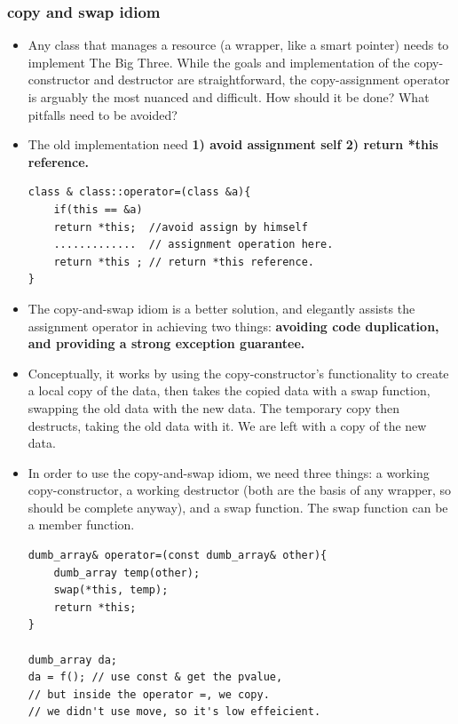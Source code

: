\documentclass[a4paper,11pt,twoside]{book}
\begin{document}
\subsubsection{copy and swap idiom}
\begin{itemize}
	\item Any class that manages a resource (a wrapper, like a smart pointer) needs to implement The Big Three. While the goals and implementation of the copy-constructor and destructor are straightforward, the copy-assignment operator is arguably the most nuanced and difficult. How should it be done? What pitfalls need to be avoided?
	
	\item The old implementation need  \textbf{1) avoid assignment self 2) return *this reference. }
\begin{lstlisting}[numbers=none]
class & class::operator=(class &a){
	if(this == &a)
	return *this;  //avoid assign by himself
	.............  // assignment operation here.
	return *this ; // return *this reference.
}	
\end{lstlisting}
	
	\item The copy-and-swap idiom is a better solution, and elegantly assists the assignment operator in achieving two things: \textbf{avoiding code duplication, and providing a strong exception guarantee.}
	
	
	\item Conceptually, it works by using the copy-constructor's functionality to create a local copy of the data, then takes the copied data with a swap function, swapping the old data with the new data. The temporary copy then destructs, taking the old data with it. We are left with a copy of the new data.
	
	
	\item In order to use the copy-and-swap idiom, we need three things: a working copy-constructor, a working destructor (both are the basis of any wrapper, so should be complete anyway), and a swap function. The swap function can be a member function.

\begin{lstlisting}[numbers=none]
dumb_array& operator=(const dumb_array& other){
	dumb_array temp(other);
	swap(*this, temp);
	return *this;
}	

dumb_array da;
da = f(); // use const & get the pvalue, 
// but inside the operator =, we copy. 
// we didn't use move, so it's low effeicient.	
\end{lstlisting}
	

\end{itemize}
\end{document}
